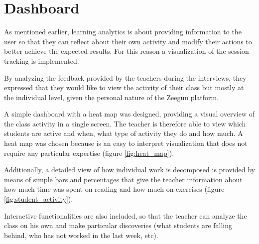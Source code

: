 \chapter{Dashboard}\label{p02:dashboard}

As mentioned earlier, learning analytics is about providing information to the user so that they can reflect about their own activity and modify their actions to better achieve the expected results. For this reason a visualization of the session tracking is implemented.

By analyzing the feedback provided by the teachers during the interviews, they expressed that they would like to view the activity of their class but mostly at the individual level, given the personal nature of the Zeeguu platform.

A simple dashboard with a heat map was designed, providing a visual overview of the class activity in a single screen. The teacher is therefore able to view which students are active and when, what type of activity they do and how much. A heat map was chosen because is an easy to interpret visualization that does not require any particular expertise (figure \ref{fig:heat_map}).


Additionally, a detailed view of how individual work is decomposed is provided by means of simple bars and percentages that give the teacher information about how much time was spent on reading and how much on exercises (figure \ref{fig:student_activity}).


Interactive functionalities are also included, so that the teacher can analyze the class on his own and make particular discoveries (\Eg what students are falling behind, who has not worked in the last week, etc).


